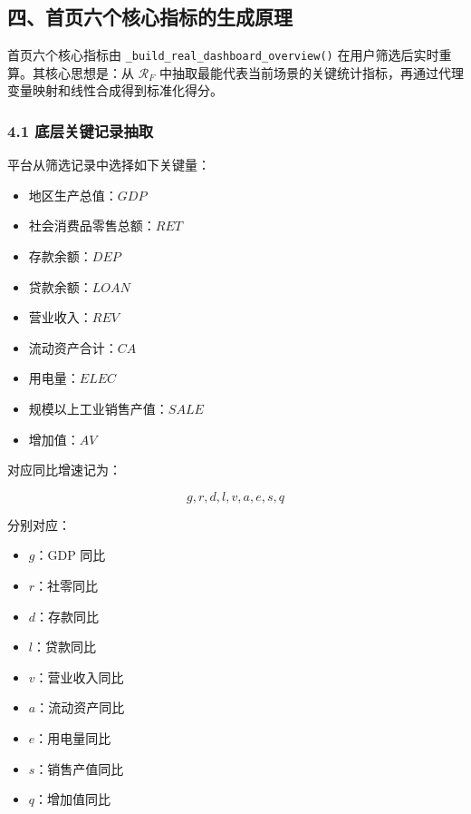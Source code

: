 \documentclass[
]{article}
\providecommand{\tightlist}{%
  \setlength{\itemsep}{0pt}\setlength{\parskip}{0pt}}
\begin{document}
\subsection{四、首页六个核心指标的生成原理}\label{ux56dbux9996ux9875ux516dux4e2aux6838ux5fc3ux6307ux6807ux7684ux751fux6210ux539fux7406}

首页六个核心指标由 \texttt{\_build\_real\_dashboard\_overview()}
在用户筛选后实时重算。其核心思想是：从 \(\mathcal{R}_F\)
中抽取最能代表当前场景的关键统计指标，再通过代理变量映射和线性合成得到标准化得分。

\subsubsection{4.1
底层关键记录抽取}\label{ux5e95ux5c42ux5173ux952eux8bb0ux5f55ux62bdux53d6}

平台从筛选记录中选择如下关键量：

\begin{itemize}
\tightlist
\item
  地区生产总值：\(GDP\)
\item
  社会消费品零售总额：\(RET\)
\item
  存款余额：\(DEP\)
\item
  贷款余额：\(LOAN\)
\item
  营业收入：\(REV\)
\item
  流动资产合计：\(CA\)
\item
  用电量：\(ELEC\)
\item
  规模以上工业销售产值：\(SALE\)
\item
  增加值：\(AV\)
\end{itemize}

对应同比增速记为：

\[
g, r, d, l, v, a, e, s, q
\]

分别对应：

\begin{itemize}
\tightlist
\item
  \(g\)：GDP 同比
\item
  \(r\)：社零同比
\item
  \(d\)：存款同比
\item
  \(l\)：贷款同比
\item
  \(v\)：营业收入同比
\item
  \(a\)：流动资产同比
\item
  \(e\)：用电量同比
\item
  \(s\)：销售产值同比
\item
  \(q\)：增加值同比
\end{itemize}
\end{document}
